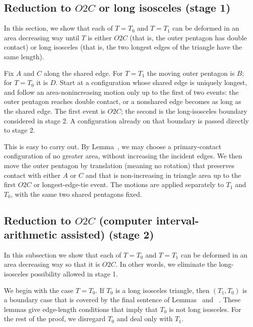 \subsection{Reduction to $O2C$ or long isosceles (stage 1)}

In this section, we show that each of $T=T_0$ and $T=T_1$ can be
deformed in an area decreasing way until $T$ is either $O2C$ (that is,
the outer pentagon has double contact) or long isosceles (that is, the
two longest edges of the triangle have the same length).

Fix $A$ and $C$ along the shared edge.  For $T=T_1$ the moving
outer pentagon is $B$; for $T=T_0$ it is $D$.  Start at a
configuration whose shared edge is uniquely longest, and follow an
area-nonincreasing motion only up to the first of two events: the
outer pentagon reaches double contact, or a nonshared edge becomes
as long as the shared edge.  The first event is $O2C$; the second
is the long-isosceles boundary considered in stage 2.  A configuration
already on that boundary is passed directly to stage 2.

This is easy to carry out. By Lemma~, we may
choose a primary-contact configuration of no greater area, without
increasing the incident edges. We then move the outer
pentagon by translation (meaning no rotation) that preserves contact
with either $A$ or $C$ and that is non-increasing in triangle area
up to the first $O2C$ or longest-edge-tie event.  The motions are
applied separately to $T_1$ and $T_0$, with the same two shared
pentagons fixed.

\subsection{Reduction to $O2C$ (computer interval-arithmetic assisted) (stage 2)}

In this subsection we show that each of $T=T_0$ and $T=T_1$ can be
deformed in an area decreasing way so that it is $O2C$.
In other words, we eliminate the long-isosceles possibility allowed in stage 1.

We begin with the case $T=T_0$.  If $T_0$ is a long isosceles
triangle, then $(T_1,T_0)$ is a boundary case that is covered by the
final sentence of Lemmas~ and ~.
These lemmas give edge-length conditions that imply that $T_0$ is not
long isosceles.  For the rest of the proof, we disregard $T_0$ and
deal only with $T_1$.

